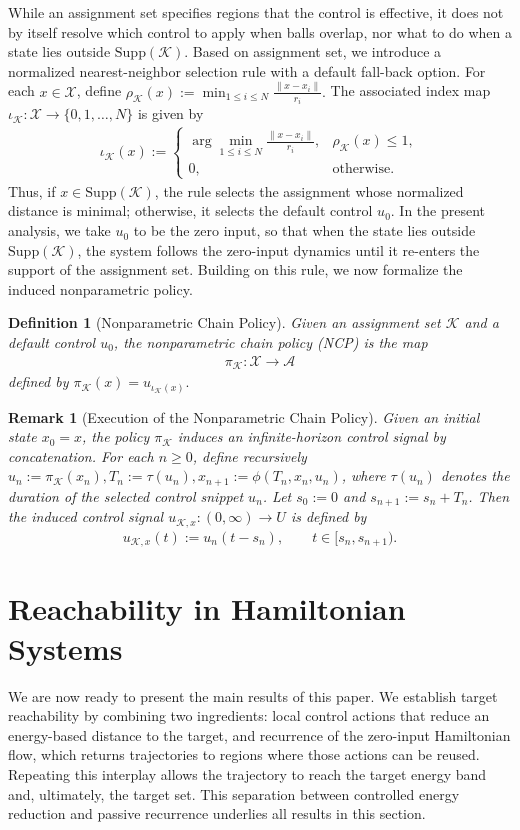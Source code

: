 \documentclass[letterpaper, 10 pt, conference]{ieeeconf}
\newtheorem{definition}{Definition}
\newtheorem{remark}{Remark}
\newcommand{\K}{\mathcal{K}}
\newcommand{\X}{\mathcal{X}}
\newcommand{\Supp}{\mathrm{Supp}}
\newcommand{\cA}{\mathcal{A}}
\begin{document}
While an assignment set specifies regions that the control is effective, it does not by itself resolve which control to apply when balls overlap, nor what to do when a state lies outside $\Supp(\K)$. Based on assignment set, we introduce
a normalized nearest-neighbor selection rule with a default fall-back option. For each $x\in\X$, define $\rho_{\K}(x) := \min_{1\le i\le N}\frac{\|x-x_i\|}{r_i}.$ The associated index map $\iota_{\K}:\X \to \{0,1,\dots,N\}$ is given by
\begin{align*}
\iota_{\K}(x):=
\begin{cases}
\displaystyle \arg\min_{1\le i\le N}\frac{\|x-x_i\|}{r_i},
& \rho_{\K}(x)\le 1,\\[1ex]
0, & \text{otherwise}.
\end{cases}
\end{align*}
Thus, if $x\in\Supp(\K)$, the rule selects the assignment whose normalized
distance is minimal; otherwise, it selects the default control $u_0$. In the
present analysis, we take $u_0$ to be the zero input, so that when the state
lies outside $\Supp(\K)$, the system follows the zero-input dynamics until it
re-enters the support of the assignment set. Building on this rule, we now
formalize the induced nonparametric policy.

\begin{definition}[Nonparametric Chain Policy]
Given an assignment set $\K$ and a default control $u_0$, the nonparametric
chain policy (NCP) is the map
\begin{align*}
    \pi_{\K}:\X\to\cA
\end{align*}
defined by $\pi_{\K}(x)=u_{\iota_{\K}(x)}.$
\end{definition}

\begin{remark}[Execution of the Nonparametric Chain Policy]
\label{rem:excution_of_NCP}
Given an initial state $x_0=x$, the policy $\pi_{\K}$ induces an infinite-horizon control signal by concatenation. For each $n\ge 0$, define recursively $u_n := \pi_{\K}(x_n), T_n := \tau(u_n),
x_{n+1} := \phi(T_n,x_n,u_n)$, where $\tau(u_n)$ denotes the duration of the selected control snippet $u_n$. Let $s_0:=0$ and $s_{n+1}:=s_n+T_n$. Then the induced control signal $u_{\K,x}:(0,\infty)\to U$ is defined by
\begin{align*}
u_{\K,x}(t):=u_n(t-s_n),\qquad t\in[s_n,s_{n+1}).
\end{align*}
\end{remark}

\section{Reachability in Hamiltonian Systems}
\label{sec:Reachability}
We are now ready to present the main results of this paper. We establish target reachability by combining two ingredients: local control actions that reduce an energy-based distance to the target, and recurrence of the zero-input Hamiltonian flow, which returns trajectories to regions where those actions can be reused. Repeating this interplay allows the trajectory to reach the target energy band and, ultimately, the target set. This separation between controlled energy reduction and passive recurrence underlies all results in this section.
\end{document}
